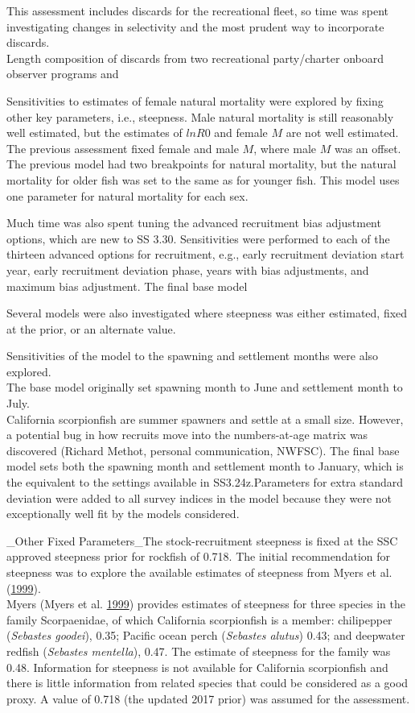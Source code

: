 \documentclass[12pt,]{article}
\begin{document}
This assessment includes discards for the recreational fleet, so time
was spent investigating changes in selectivity and the most prudent way
to incorporate discards.\\
Length composition of discards from two recreational party/charter
onboard observer programs and

Sensitivities to estimates of female natural mortality were explored by
fixing other key parameters, i.e., steepness. Male natural mortality is
still reasonably well estimated, but the estimates of \(lnR0\) and
female \(M\) are not well estimated. The previous assessment fixed
female and male \(M\), where male \(M\) was an offset. The previous
model had two breakpoints for natural mortality, but the natural
mortality for older fish was set to the same as for younger fish. This
model uses one parameter for natural mortality for each sex.

Much time was also spent tuning the advanced recruitment bias adjustment
options, which are new to SS 3.30. Sensitivities were performed to each
of the thirteen advanced options for recruitment, e.g., early
recruitment deviation start year, early recruitment deviation phase,
years with bias adjustments, and maximum bias adjustment. The final base
model

Several models were also investigated where steepness was either
estimated, fixed at the prior, or an alternate value.

Sensitivities of the model to the spawning and settlement months were
also explored.\\
The base model originally set spawning month to June and settlement
month to July.\\
California scorpionfish are summer spawners and settle at a small size.
However, a potential bug in how recruits move into the numbers-at-age
matrix was discovered (Richard Methot, personal communication, NWFSC).
The final base model sets both the spawning month and settlement month
to January, which is the equivalent to the settings available in
SS3.24z.Parameters for extra standard deviation were added to all survey
indices in the model because they were not exceptionally well fit by the
models considered.

\_Other Fixed Parameters\_The stock-recruitment steepness is fixed at
the SSC approved steepness prior for rockfish of 0.718. The initial
recommendation for steepness was to explore the available estimates of
steepness from Myers et al. (\protect\hyperlink{ref-Myers1999}{1999}).\\
Myers (Myers et al. \protect\hyperlink{ref-Myers1999}{1999}) provides
estimates of steepness for three species in the family Scorpaenidae, of
which California scorpionfish is a member: chilipepper (\emph{Sebastes
goodei}), 0.35; Pacific ocean perch (\emph{Sebastes alutus}) 0.43; and
deepwater redfish (\emph{Sebastes mentella}), 0.47. The estimate of
steepness for the family was 0.48. Information for steepness is not
available for California scorpionfish and there is little information
from related species that could be considered as a good proxy. A value
of 0.718 (the updated 2017 prior) was assumed for the assessment.
\end{document}
